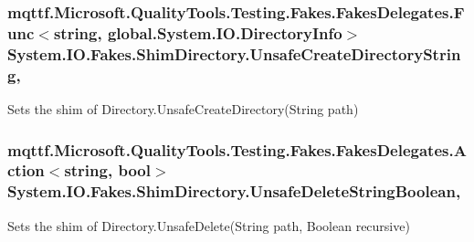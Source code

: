 \hypertarget{class_system_1_1_i_o_1_1_fakes_1_1_shim_directory_ab965aad399d229f3aa5dbf36fd39234a}{
\subsubsection[{Unsafe\-Create\-Directory\-String}]{\setlength{\rightskip}{0pt plus 5cm}mqttf.\-Microsoft.\-Quality\-Tools.\-Testing.\-Fakes.\-Fakes\-Delegates.\-Func$<$string, global.\-System.\-I\-O.\-Directory\-Info$>$ System.\-I\-O.\-Fakes.\-Shim\-Directory.\-Unsafe\-Create\-Directory\-String\hspace{0.3cm}{\ttfamily [static]}, {\ttfamily [set]}}}\label{class_system_1_1_i_o_1_1_fakes_1_1_shim_directory_ab965aad399d229f3aa5dbf36fd39234a}


Sets the shim of Directory.\-Unsafe\-Create\-Directory(\-String path)

\hypertarget{class_system_1_1_i_o_1_1_fakes_1_1_shim_directory_af9fc8f76d30819ce028d66f33804cb3b}{
\subsubsection[{Unsafe\-Delete\-String\-Boolean}]{\setlength{\rightskip}{0pt plus 5cm}mqttf.\-Microsoft.\-Quality\-Tools.\-Testing.\-Fakes.\-Fakes\-Delegates.\-Action$<$string, bool$>$ System.\-I\-O.\-Fakes.\-Shim\-Directory.\-Unsafe\-Delete\-String\-Boolean\hspace{0.3cm}{\ttfamily [static]}, {\ttfamily [set]}}}\label{class_system_1_1_i_o_1_1_fakes_1_1_shim_directory_af9fc8f76d30819ce028d66f33804cb3b}


Sets the shim of Directory.\-Unsafe\-Delete(\-String path, Boolean recursive)

